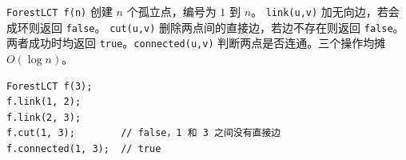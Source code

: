 \verb|ForestLCT f(n)| 创建 $n$ 个孤立点，编号为 $1$ 到 $n$。
\verb|link(u,v)| 加无向边，若会成环则返回 \verb|false|。
\verb|cut(u,v)| 删除两点间的直接边，若边不存在则返回 \verb|false|。
两者成功时均返回 \verb|true|。\verb|connected(u,v)| 判断两点是否连通。三个操作均摊 $O(\log n)$。

\begin{verbatim}
ForestLCT f(3);
f.link(1, 2);
f.link(2, 3);
f.cut(1, 3);        // false，1 和 3 之间没有直接边
f.connected(1, 3);  // true
\end{verbatim}
